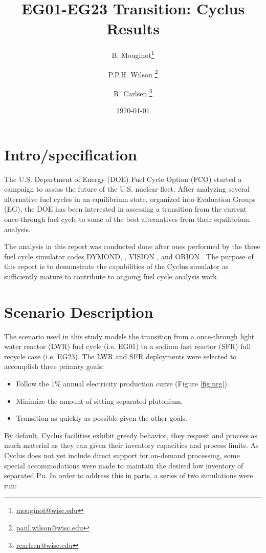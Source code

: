 \documentclass[12pt]{article}
\title{EG01-EG23 Transition: Cyclus Results}
\author[1]{B. Mouginot\thanks{\href{mailto:mouginot@wisc.edu}{mouginot@wisc.edu}}}
\author[1]{P.P.H. Wilson \thanks{\href{mailto:paul.wilson@wisc.edu}{paul.wilson@wisc.edu}}}
\author[1]{R. Carlsen \thanks{\href{mailto:rcarlsen@wisc.edu}{rcarlsen@wisc.edu}}}
\affil[1]{University of Wisconsin--Madison, Department of Engineering Physics, CNERG group}
\date{\today}
\begin{document}
\maketitle

\section{Intro/specification}

The U.S. Department of Energy (DOE) Fuel Cycle Option (FCO) started a campaign
to assess the future of the U.S. nuclear fleet. After analyzing several
alternative fuel cycles in an equilibrium state, organized into Evaluation
Groups (EG), the DOE has been interested in assessing a transition from the
current once-through fuel cycle to some of the best alternatives from their
equilibrium analysis.

The analysis in this report was conducted done after ones performed by the
three fuel cycle simulator codes DYMOND, \cite{dymon}, VISION \cite{vision},
and ORION \cite{orion}. The purpose of this report is to demonstrate the
capabilities of the Cyclus simulator \cite{cyclus} as sufficiently mature to
contribute to ongoing fuel cycle analysis work.

\section{Scenario Description}

The scenario used in this study models the transition from a once-through
light water reactor (LWR) fuel cycle (i.e. EG01) to a sodium fast reactor
(SFR) full recycle case (i.e. EG23).  The LWR and SFR deployments were
selected to accomplish three primary goals:

\begin{itemize}
    \item Follow the 1\% annual electricity production curve (Figure \ref{fig:nrg}).
    \item Minimize the amount of sitting separated plutonium.
    \item Transition as quickly as possible given the other goals.
\end{itemize}

By default, Cyclus facilities exhibit greedy behavior, they request and
process as much material as they can given their inventory capacities and
process limits.  As Cyclus does not yet include direct support for on-demand
processing, some special accommodations were made to maintain the desired low
inventory of separated Pu.  In order to address this in parts, a series of two
simulations were run:
\end{document}

